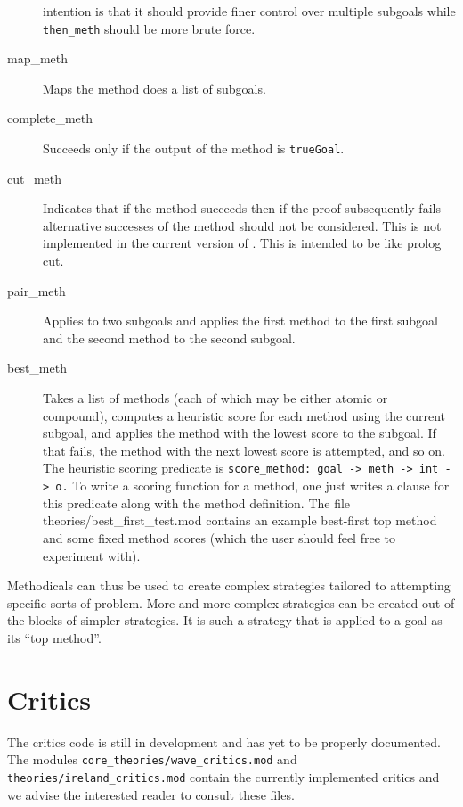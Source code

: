 \begin{description}
  intention is that it should provide finer control over multiple
  subgoals while {\tt then\_meth} should be more brute force.
\item[map\_meth\index{map\_meth}] Maps the method does a list of
  subgoals.
\item[complete\_meth\index{complete\_meth}] Succeeds only if the
  output of the method is {\tt trueGoal}.
\item[cut\_meth\index{cut\_meth}] Indicates that if the method
  succeeds then if the proof subsequently fails alternative successes
  of the method should not be considered.  This is not implemented in
  the current version of \lclam.  This is intended to be like prolog cut.
\item[pair\_meth\index{pair\_meth}] Applies to two subgoals and
  applies the first method to the first subgoal and the second method
  to the second subgoal.
\item[best\_meth\index{best\_meth}] Takes a list of methods (each of
  which may be either atomic or compound), computes a heuristic score
  for each method using the current subgoal, and applies the method
  with the lowest score to the subgoal.  If that fails, the method
  with the next lowest score is attempted, and so on.  The heuristic
  scoring predicate is \texttt{score\_method: goal -> meth -> int ->
    o.}  To write a scoring function for a method, one just writes a
  clause for this predicate along with the method definition.  The
  file theories/best\_first\_test.mod contains an example best-first
  top method and some fixed method scores (which the user should feel
  free to experiment with).
\end{description}

Methodicals can thus be used to create complex
strategies tailored to attempting specific sorts of problem.  More and 
more complex strategies can be created out of the blocks of simpler
strategies.  It is such a strategy that is applied to a goal as its
``top method''.  

\section{Critics}

The critics code is still in development and has yet to be properly
documented.  The modules {\tt core\_theories/wave\_critics.mod} and
{\tt theories/ireland\_critics.mod} contain the currently implemented
critics and we advise the interested reader to consult these files.

